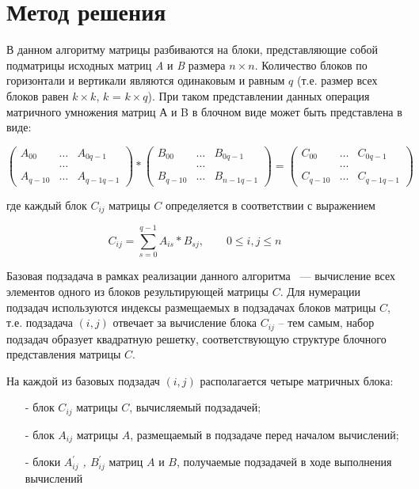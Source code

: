 \documentclass{report}
\begin{document}
\section*{Метод решения}
В данном алгоритму матрицы разбиваются на блоки, представляющие собой подматрицы исходных матриц {\itshape A} и {\itshape B} размера {\itshape $n \times n$}. Количество блоков по горизонтали и вертикали являются одинаковым и равным {\itshape $q$} (т.е. размер всех блоков равен {\itshape $k \times k$}, {\itshape $k$} = {\itshape $k \times q$}). При таком представлении данных операция матричного умножения матриц А и B в блочном виде может быть представлена в виде:
\par
$$
\begin{pmatrix}
A_{00}& \ldots & A_{0q-1}\\
& \ldots\\
A_{q-10}& \ldots & A_{q-1q-1}
\end{pmatrix}
*
\begin{pmatrix}
B_{00}& \ldots & B_{0q-1}\\
& \ldots\\
B_{q-10}& \ldots & B_{n-1q-1}
\end{pmatrix}
=
\begin{pmatrix}
C_{00}& \ldots & C_{0q-1}\\
&\ldots\\
C_{q-10}& \ldots & C_{q-1q-1}
\end{pmatrix}
$$

где каждый блок $C_{ij}$ матрицы {\itshape $C$} определяется в соответствии с выражением
\par$$
    C_{ij} = \sum_{s=0}^{q-1} A_{is} * B_{sj},\qquad 0 \le i,j \le n \qquad
    $$
\par Базовая подзадача в рамках реализации данного алгоритма ~--- вычисление всех элементов одного из блоков результирующей матрицы {\itshape $C$}. Для нумерации подзадач используются индексы размещаемых в подзадачах блоков матрицы {\itshape $C$}, т.е. подзадача {\itshape $(i,j)$} отвечает за вычисление блока {\itshape $C_{ij}$} – тем самым, набор подзадач образует квадратную решетку, соответствующую структуре блочного представления матрицы {\itshape $C$}.
\par На каждой из базовых подзадач {\itshape $(i,j)$} располагается четыре матричных блока:
\begin{itemize}
    \item[-] блок {\itshape $C_{ij}$} матрицы {\itshape $C$}, вычисляемый подзадачей;
    \item[-] блок {\itshape $A_{ij}$} матрицы {\itshape $A$}, размещаемый в подзадаче перед началом вычислений;
    \item[-] блоки {\itshape $A_{ij}^{'}$ , $B_{ij}^{'}$} матриц {\itshape $A$} и {\itshape $B$}, получаемые подзадачей в ходе выполнения вычислений
\end{itemize}
\newpage
\end{document}
